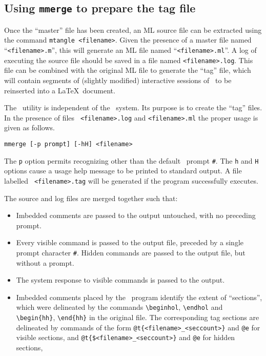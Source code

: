 \subsection{Using {\tt mmerge} to prepare the tag file}

Once the ``master'' file has been created, an ML source file can be
extracted using the command {\tt mtangle <filename>}.  Given the
presence of a master file named ``{\tt <filename>.m}'', this will
generate an ML file named ``{\tt <filename>.ml}''.  A log of executing
the source file should be saved in a file named {\tt <filename>.log}.
This file can be combined with the original ML file to generate the
``tag'' file, which will contain segments of (slightly modified)
interactive sessions of \HOL\ to be reinserted into a \LaTeX\ document.

The \merge\ utility is independent of the \mweb\ system.  Its purpose is
to create the ``tag'' files.  In the presence of files {\tt
<filename>.log} and {\tt <filename>.ml} the proper usage is given as follows.
\begin{center}
\verb+mmerge [-p prompt] [-hH] <filename>+
\end{center}
The {\tt p} option permits recognizing other than the default \HOL\
prompt \verb+#+.  The {\tt h} and {\tt H} options cause a usage help
message to be printed to standard output.  A file labelled {\tt
<filename>.tag} will be generated if the program successfully
executes.

The source and log files are merged together such that:
\begin{itemize}
\item Imbedded comments are passed to the output untouched, with no
preceding prompt.
\item Every visible command is passed to the output file, preceded by a single
prompt character \verb+#+.  Hidden commands are passed to the output
file, but without a prompt.
\item The system response to visible commands is passed to the output.
\item Imbedded comments placed by the \tangle\ program identify the
extent of ``sections'', which were delineated by the commands
\verb|\beginhol|, \verb|\endhol| and \verb|\begin{hh}|,
\verb|\end{hh}| in the original file.
The corresponding tag sections
are delineated by commands of the form
\verb|@t{<filename>_<seccount>}| and \verb|@e| for visible sections,
and \verb|@t{$<filename>_<seccount>}| and \verb|@e| for hidden sections,
\end{itemize}

